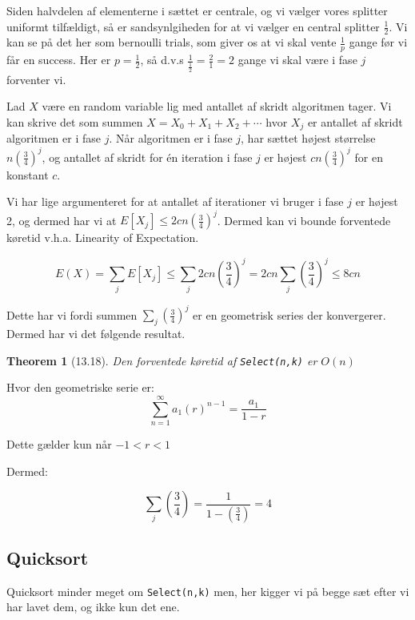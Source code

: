 \documentclass[11pt]{article}
\newtheorem{theorem}{Theorem}
\theoremstyle{definition}
\theoremstyle{remark}
\begin{document}
Siden halvdelen af elementerne i sættet er centrale, og vi vælger vores splitter uniformt tilfældigt, så er sandsynlgiheden for at vi vælger en central splitter $\frac{1}{2}$. Vi kan se på det her som bernoulli trials, som giver os at vi skal vente $\frac{1}{p}$ gange før vi får en success. Her er $p = \frac{1}{2}$, så d.v.s $\frac{1}{\frac{1}{2}} = \frac{2}{1} = 2$ gange vi skal være  i fase $j$ forventer vi.

Lad $X$ være en random variable lig med antallet af skridt algoritmen tager. Vi kan skrive det som summen $X = X_{0} + X_{1} + X_{2} + \cdots$ hvor $X_{j}$ er antallet af skridt algoritmen er i fase $j$. Når algoritmen er i fase $j$, har sættet højest størrelse $n \left(  \frac{3}{4} \right)^{j}$, og antallet af skridt for én iteration i fase $j$ er højest $cn \left( \frac{3}{4} \right)^{j}$ for en konstant $c$.

Vi har lige argumenteret for at antallet af iterationer vi bruger i fase $j$ er højest 2, og dermed har vi at $E[X_{j}] \leq 2cn \left( \frac{3}{4} \right)^{j}$. Dermed kan vi bounde forventede køretid v.h.a. Linearity of Expectation.

\[
E(X) = \sum_{j}^{}E[X_{j}] \leq \sum_{j}^{} 2cn \left(  \frac{3}{4} \right)^{j} = 2cn \sum_{j}^{} \left( \frac{3}{4} \right)^{j} \leq 8cn
\]

Dette har vi fordi summen $\sum_{j}^{} \left(  \frac{3}{4} \right)^{j}$ er en geometrisk series der konvergerer. Dermed har vi det følgende resultat.

\begin{theorem}[13.18]
Den forventede køretid af \texttt{Select(n,k)} er $O(n)$
\end{theorem}

Hvor den geometriske serie er:
\[
\sum_{n=1}^{\infty}a_{1}(r)^{n-1} = \frac{a_{1}}{1-r}
\]

Dette gælder kun når $-1 < r < 1$

Dermed:


\[
\sum_{j}^{} \left(  \frac{3}{4} \right) = \frac{1}{1- \left( \frac{3}{4} \right)} = 4
\]

\subsection{Quicksort}
\label{subsec:label}

Quicksort minder meget om \texttt{Select(n,k)} men, her kigger vi på begge sæt efter vi har lavet dem, og ikke kun det ene. 
\end{document}
